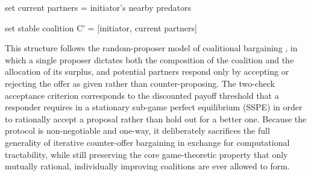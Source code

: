\documentclass[12pt,a4paper]{report}
\begin{document}
	\begin{algorithm}[H]
		\caption{Iterative Coalition Bargaining Protocol}
		\label{alg:execute_coalition_negotiation}
		
		
		
		\BlankLine
		
		set current partners = initiator's nearby predators\;
		
		set stable coalition C' = [initiator, current partners]\;
	\end{algorithm}
	
	\vspace{1em}
	
	This structure follows the random-proposer model of coalitional bargaining \cite{Okada2011}, in which a single proposer dictates both the composition of the coalition and the allocation of its surplus, and potential partners respond only by accepting or rejecting the offer as given rather than counter-proposing. The two-check acceptance criterion corresponds to the discounted payoff threshold that a responder requires in a stationary sub-game perfect equilibrium (SSPE) \cite{Okada2011} in order to rationally accept a proposal rather than hold out for a better one. Because the protocol is non-negotiable and one-way, it deliberately sacrifices the full generality of iterative counter-offer bargaining in exchange for computational tractability, while still preserving the core game-theoretic property that only mutually rational, individually improving coalitions are ever allowed to form.
		
\end{document}
